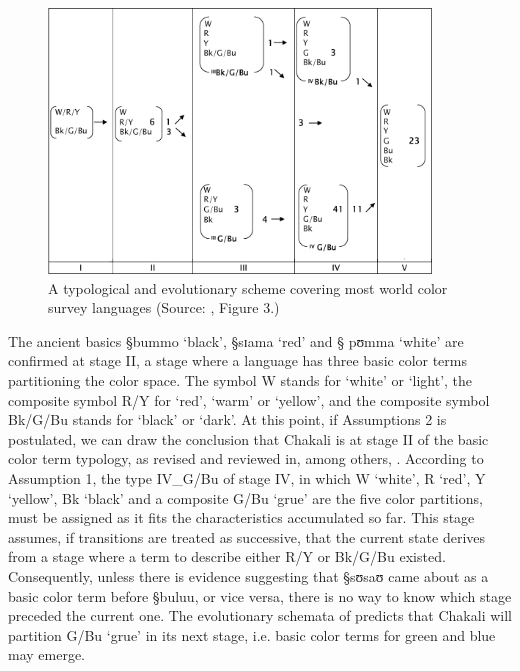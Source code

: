\begin{figure}
\begin{center}
 \includegraphics[width=4in]{Graphic/Pictures/fig1.png}
\end{center}
\caption[A typological and evolutionary scheme]{A typological and
evolutionary
scheme covering most world color survey languages (Source: \cite{Kay99}, Figure
3.)\label{fig:COL-Kay-Maffi-99}}
\end{figure}


The  ancient basics {\S bummo} `black', {\S sɪama} `red'  and    {\S
pʊmma} `white'  are  confirmed at stage
II, a stage where a language has three basic color terms partitioning the
color space. The symbol W stands
for `white' or  `light', the composite symbol R/Y for  `red',  `warm' or 
`yellow',  and  the composite symbol Bk/G/Bu stands for 
  `black' or `dark'. At this
point, if Assumptions 2 is
postulated, we can draw
the conclusion that Chakali is at stage II of the basic color term
typology, as revised and reviewed in,  among others,  \cite{Kay75, Kay97, Kay99,
Kay05}.  According to Assumption 1, the type {IV}_{G/Bu} of stage IV, in
which W  `white', R `red', Y
`yellow', Bk `black' and a composite G/Bu `grue' are the five color partitions,
must be  assigned as it 
fits the characteristics accumulated so far.  This
stage assumes, if 
transitions are treated as successive,  that  the current state derives
from  a  stage where a term to describe either
R/Y  or Bk/G/Bu  existed. Consequently, unless there is 
evidence 
suggesting that  {\S sʊsaʊ} came about as a basic color term before  {\S buluu},
or vice versa, there is no way to know which stage preceded the current one.
The evolutionary schemata of \cite{Kay99}  predicts that Chakali will
partition G/Bu
`grue' in its next stage, i.e.  basic color terms for green and
blue may emerge.






